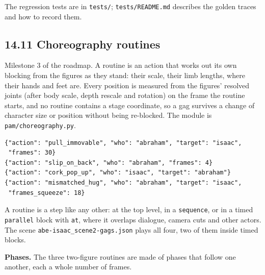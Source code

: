 \documentclass[
  12pt,
  letterpaper,
]{book}
\begin{document}
The regression tests are in \texttt{tests/}; \texttt{tests/README.md}
describes the golden traces and how to record them.

\subsection{14.11 Choreography routines}\label{choreography-routines}

Milestone 3 of the roadmap. A routine is an action that works out its
own blocking from the figures as they stand: their scale, their limb
lengths, where their hands and feet are. Every position is measured
from the figures' resolved joints (after body scale, depth rescale and
rotation) on the frame the routine starts, and no routine contains a
stage coordinate, so a gag survives a change of character size or
position without being re-blocked. The module is
\texttt{pam/choreography.py}.

\begin{verbatim}
{"action": "pull_immovable", "who": "abraham", "target": "isaac",
 "frames": 30}
{"action": "slip_on_back", "who": "abraham", "frames": 4}
{"action": "cork_pop_up", "who": "isaac", "target": "abraham"}
{"action": "mismatched_hug", "who": "abraham", "target": "isaac",
 "frames_squeeze": 18}
\end{verbatim}

A routine is a step like any other: at the top level, in a
\texttt{sequence}, or in a timed \texttt{parallel} block with
\texttt{at}, where it overlaps dialogue, camera cuts and other actors.
The scene \texttt{abe-isaac\_scene2-gags.json} plays all four, two of
them inside timed blocks.

\textbf{Phases.} The
three two-figure routines are made of phases that follow one another,
each a whole number of frames.
\end{document}
